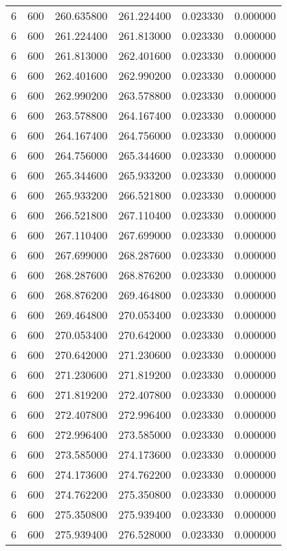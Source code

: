 \begin{longtable}{rrrrrr}
6 & 600 & 260.635800 & 261.224400 & 0.023330 & 0.000000 \\
6 & 600 & 261.224400 & 261.813000 & 0.023330 & 0.000000 \\
6 & 600 & 261.813000 & 262.401600 & 0.023330 & 0.000000 \\
6 & 600 & 262.401600 & 262.990200 & 0.023330 & 0.000000 \\
6 & 600 & 262.990200 & 263.578800 & 0.023330 & 0.000000 \\
6 & 600 & 263.578800 & 264.167400 & 0.023330 & 0.000000 \\
6 & 600 & 264.167400 & 264.756000 & 0.023330 & 0.000000 \\
6 & 600 & 264.756000 & 265.344600 & 0.023330 & 0.000000 \\
6 & 600 & 265.344600 & 265.933200 & 0.023330 & 0.000000 \\
6 & 600 & 265.933200 & 266.521800 & 0.023330 & 0.000000 \\
6 & 600 & 266.521800 & 267.110400 & 0.023330 & 0.000000 \\
6 & 600 & 267.110400 & 267.699000 & 0.023330 & 0.000000 \\
6 & 600 & 267.699000 & 268.287600 & 0.023330 & 0.000000 \\
6 & 600 & 268.287600 & 268.876200 & 0.023330 & 0.000000 \\
6 & 600 & 268.876200 & 269.464800 & 0.023330 & 0.000000 \\
6 & 600 & 269.464800 & 270.053400 & 0.023330 & 0.000000 \\
6 & 600 & 270.053400 & 270.642000 & 0.023330 & 0.000000 \\
6 & 600 & 270.642000 & 271.230600 & 0.023330 & 0.000000 \\
6 & 600 & 271.230600 & 271.819200 & 0.023330 & 0.000000 \\
6 & 600 & 271.819200 & 272.407800 & 0.023330 & 0.000000 \\
6 & 600 & 272.407800 & 272.996400 & 0.023330 & 0.000000 \\
6 & 600 & 272.996400 & 273.585000 & 0.023330 & 0.000000 \\
6 & 600 & 273.585000 & 274.173600 & 0.023330 & 0.000000 \\
6 & 600 & 274.173600 & 274.762200 & 0.023330 & 0.000000 \\
6 & 600 & 274.762200 & 275.350800 & 0.023330 & 0.000000 \\
6 & 600 & 275.350800 & 275.939400 & 0.023330 & 0.000000 \\
6 & 600 & 275.939400 & 276.528000 & 0.023330 & 0.000000 \\

\end{longtable}
